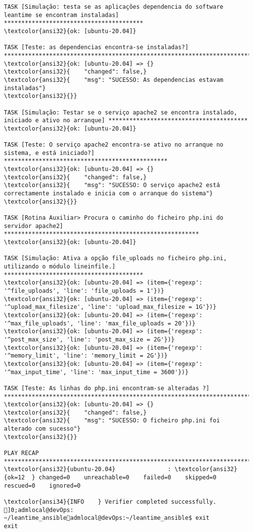 \documentclass{scrartcl}
\begin{document}
\begin{Verbatim}
TASK [Simulação: testa se as aplicações dependencia do software leantime se encontram instaladas] ****************************************
\textcolor{ansi32}{ok: [ubuntu-20.04]}

TASK [Teste: as dependencias encontra-se instaladas?] ************************************************************************************
\textcolor{ansi32}{ok: [ubuntu-20.04] => {}
\textcolor{ansi32}{    "changed": false,}
\textcolor{ansi32}{    "msg": "SUCESSO: As dependencias estavam instaladas"}
\textcolor{ansi32}{}}

TASK [Simulação: Testar se o serviço apache2 se encontra instalado, iniciado e ativo no arranque] ****************************************
\textcolor{ansi32}{ok: [ubuntu-20.04]}

TASK [Teste: O serviço apache2 encontra-se ativo no arranque no sistema, e está iniciado?] ***********************************************
\textcolor{ansi32}{ok: [ubuntu-20.04] => {}
\textcolor{ansi32}{    "changed": false,}
\textcolor{ansi32}{    "msg": "SUCESSO: O serviço apache2 está correctamente instalado e inicia com o arranque do sistema"}
\textcolor{ansi32}{}}

TASK [Rotina Auxiliar> Procura o caminho do ficheiro php.ini do servidor apache2] ********************************************************
\textcolor{ansi32}{ok: [ubuntu-20.04]}

TASK [Simulação: Ativa a opção file_uploads no ficheiro php.ini, utilizando o módulo lineinfile.] ****************************************
\textcolor{ansi32}{ok: [ubuntu-20.04] => (item={'regexp': '^file_uploads', 'line': 'file_uploads = 1'})}
\textcolor{ansi32}{ok: [ubuntu-20.04] => (item={'regexp': '^upload_max_filesize', 'line': 'upload_max_filesize = 1G'})}
\textcolor{ansi32}{ok: [ubuntu-20.04] => (item={'regexp': '^max_file_uploads', 'line': 'max_file_uploads = 20'})}
\textcolor{ansi32}{ok: [ubuntu-20.04] => (item={'regexp': '^post_max_size', 'line': 'post_max_size = 2G'})}
\textcolor{ansi32}{ok: [ubuntu-20.04] => (item={'regexp': '^memory_limit', 'line': 'memory_limit = 2G'})}
\textcolor{ansi32}{ok: [ubuntu-20.04] => (item={'regexp': '^max_input_time', 'line': 'max_input_time = 3600'})}

TASK [Teste: As linhas do php.ini encontram-se alteradas ?] ******************************************************************************
\textcolor{ansi32}{ok: [ubuntu-20.04] => {}
\textcolor{ansi32}{    "changed": false,}
\textcolor{ansi32}{    "msg": "SUCESSO: O ficheiro php.ini foi alterado com sucesso"}
\textcolor{ansi32}{}}

PLAY RECAP *******************************************************************************************************************************
\textcolor{ansi32}{ubuntu-20.04}               : \textcolor{ansi32}{ok=12  } changed=0    unreachable=0    failed=0    skipped=0    rescued=0    ignored=0

\textcolor{ansi34}{INFO    } Verifier completed successfully.
]0;admlocal@devOps: ~/leantime_ansibleadmlocal@devOps:~/leantime_ansible$ exit
exit

\end{Verbatim}
\end{document}
